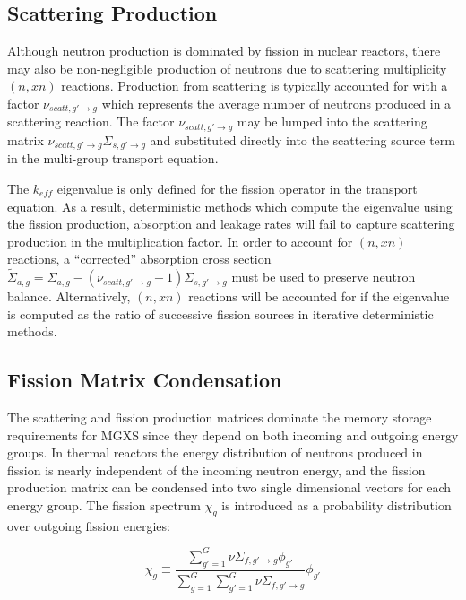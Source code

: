 \subsection{Scattering Production}
\label{sec:chap2-scatt-prod}

Although neutron production is dominated by fission in nuclear reactors, there may also be non-negligible production of neutrons due to scattering multiplicity $(n,xn)$ reactions. Production from scattering is typically accounted for with a factor $\nu_{scatt,g' \rightarrow g}$ which represents the average number of neutrons produced in a scattering reaction. The factor $\nu_{scatt,g' \rightarrow g}$ may be lumped into the scattering matrix $\nu_{scatt,g' \rightarrow g}\Sigma_{s,g' \rightarrow g}$ and substituted directly into the scattering source term in the multi-group transport equation. 

The $k_{eff}$ eigenvalue is only defined for the fission operator in the transport equation. As a result, deterministic methods which compute the eigenvalue using the fission production, absorption and leakage rates will fail to capture scattering production in the multiplication factor. In order to account for $(n,xn)$ reactions, a ``corrected'' absorption cross section $\tilde{\Sigma}_{a,g} = \Sigma_{a,g} - (\nu_{scatt,g' \rightarrow g} - 1)\Sigma_{s,g' \rightarrow g}$ must be used to preserve neutron balance. Alternatively, $(n,xn)$ reactions will be accounted for if the eigenvalue is computed as the ratio of successive fission sources in iterative deterministic methods.


\subsection{Fission Matrix Condensation}
\label{sec:chap2-fiss-mat}

The scattering and fission production matrices dominate the memory storage requirements for \ac{MGXS} since they depend on both incoming and outgoing energy groups. In thermal reactors the energy distribution of neutrons produced in fission is nearly independent of the incoming neutron energy, and the fission production matrix can be condensed into two single dimensional vectors for each energy group. The fission spectrum $\chi_{g}$ is introduced as a probability distribution over outgoing fission energies:

\begin{dmath}
\label{eqn:chap2-chi}
\chi_{g} \equiv \frac{\displaystyle\sum\limits_{g'=1}^{G}\nu\Sigma_{f,g'\rightarrow g}\phi_{g'}}{\displaystyle\sum\limits_{g=1}^{G}\displaystyle\sum\limits_{g'=1}^{G}\nu\Sigma_{f,g'\rightarrow g}}\phi_{g'}
\end{dmath}

